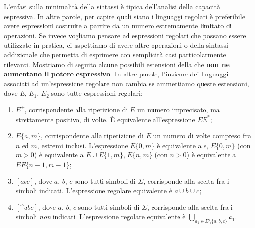 L'enfasi sulla minimalità della sintassi è tipica dell'analisi della capacità espressiva.
In altre parole, per capire quali siano i linguaggi regolari è preferibile avere espressioni costruite a partire da un
numero estremamente limitato di operazioni.
Se invece vogliamo pensare ad espressioni regolari che possano essere utilizzate in pratica, ci aspettiamo di avere
altre operazioni o della sintassi addizionale che permetta di esprimere con semplicità casi particolarmente rilevanti.
Mostriamo di seguito alcune possibili estensioni della  che \textbf{non ne aumentano il potere espressivo}.
In altre parole, l'insieme dei linguaggi associati ad un'espressione regolare non cambia se ammettiamo queste
estensioni, dove $E$, $E_1$, $E_2$ sono tutte espressioni regolari:

\begin{enumerate}
\item $E^{+}$, corrispondente  alla ripetizione di $E$ un numero imprecisato, ma strettamente positivo,  di volte.
È equivalente all'espressione $E E^{*}$;
\item $E\{n,m\}$, corrispondente  alla ripetizione di $E$ un numero di volte compreso fra $n$ ed $m$, estremi inclusi.
L'espressione $E\{0,m\}$ è equivalente a $\epsilon$, $E\{0,m\}$ (con $m>0$) è equivalente a $E \cup E\{1,m\}$,
	  $E\{n,m\}$ (con $n>0$) è equivalente a $E E\{n-1,m-1\}$;
\item $[abc]$, dove $a$, $b$, $c$ sono tutti simboli di $\Sigma$, corrisponde alla scelta fra i simboli indicati.
	  L'espressione regolare equivalente è $a\cup b\cup c$;
\item $[\^ abc]$, dove $a$, $b$, $c$ sono tutti simboli di $\Sigma$, corrisponde alla scelta fra i simboli \emph{non} indicati.
	  L'espressione regolare equivalente è $\bigcup_{a_{1}\in \Sigma \setminus \{a,b,c\}} a_{1}$.
\end{enumerate}




